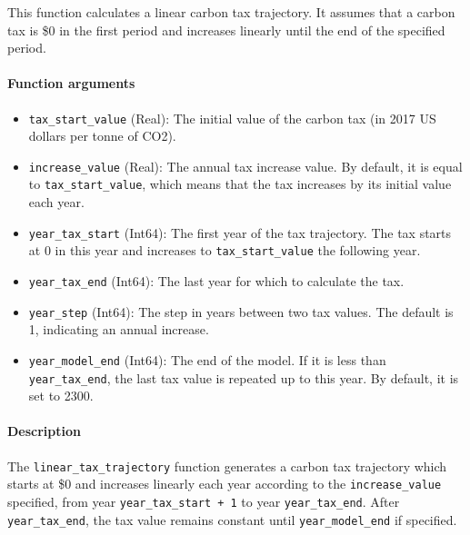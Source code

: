 \documentclass[
]{article}
\providecommand{\tightlist}{%
  \setlength{\itemsep}{0pt}\setlength{\parskip}{0pt}}
\begin{document}
This function calculates a linear carbon tax trajectory. It assumes that
a carbon tax is \$0 in the first period and increases linearly until the
end of the specified period.

\paragraph{Function arguments}\label{function-arguments-1}

\begin{itemize}
\tightlist
\item
  \texttt{tax\_start\_value} (Real): The initial value of the carbon tax
  (in 2017 US dollars per tonne of CO2).
\item
  \texttt{increase\_value} (Real): The annual tax increase value. By
  default, it is equal to \texttt{tax\_start\_value}, which means that
  the tax increases by its initial value each year.
\item
  \texttt{year\_tax\_start} (Int64): The first year of the tax
  trajectory. The tax starts at 0 in this year and increases to
  \texttt{tax\_start\_value} the following year.
\item
  \texttt{year\_tax\_end} (Int64): The last year for which to calculate
  the tax.
\item
  \texttt{year\_step} (Int64): The step in years between two tax values.
  The default is 1, indicating an annual increase.
\item
  \texttt{year\_model\_end} (Int64): The end of the model. If it is less
  than \texttt{year\_tax\_end}, the last tax value is repeated up to
  this year. By default, it is set to 2300.
\end{itemize}

\paragraph{Description}\label{description}

The \texttt{linear\_tax\_trajectory} function generates a carbon tax
trajectory which starts at \$0 and increases linearly each year
according to the \texttt{increase\_value} specified, from year
\texttt{year\_tax\_start\ +\ 1} to year \texttt{year\_tax\_end}. After
\texttt{year\_tax\_end}, the tax value remains constant until
\texttt{year\_model\_end} if specified.
\end{document}
